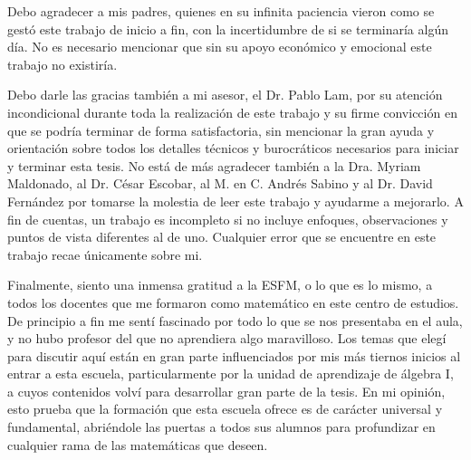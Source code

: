 {\setlength\parindent{1em}
Debo agradecer a mis padres, quienes en su infinita paciencia vieron como se gestó este trabajo de inicio a fin, con la incertidumbre de si se terminaría algún día. No es necesario mencionar que sin su apoyo económico y emocional este trabajo no existiría.

Debo darle las gracias también a mi asesor, el Dr. Pablo Lam, por su atención incondicional durante toda la realización de este trabajo y su firme convicción en que se podría terminar de forma satisfactoria, sin mencionar la gran ayuda y orientación sobre todos los detalles técnicos y burocráticos necesarios para iniciar y terminar esta tesis. No está de más agradecer también a la Dra. Myriam Maldonado, al Dr. César Escobar, al M. en C. Andrés Sabino y al Dr. David Fernández por tomarse la molestia de leer este trabajo y ayudarme a mejorarlo. A fin de cuentas, un trabajo es incompleto si no incluye enfoques, observaciones y puntos de vista diferentes al de uno. Cualquier error que se encuentre en este trabajo recae únicamente sobre mi.

Finalmente, siento una inmensa gratitud a la ESFM, o lo que es lo mismo, a todos los docentes que me formaron como matemático en este centro de estudios. De principio a fin me sentí fascinado por todo lo que se nos presentaba en el aula, y no hubo profesor del que no aprendiera algo maravilloso. Los temas que elegí para discutir aquí están en gran parte influenciados por mis más tiernos inicios al entrar a esta escuela, particularmente por la unidad de aprendizaje de álgebra I, a cuyos contenidos volví para desarrollar gran parte de la tesis. En mi opinión, esto prueba que la formación que esta escuela ofrece es de carácter universal y fundamental, abriéndole las puertas a todos sus alumnos para profundizar en cualquier rama de las matemáticas que deseen.}





\newpage
\thispagestyle{empty}
\

\newpage
{}
\thispagestyle{plain}
\tableofcontents
\newpage
\thispagestyle{empty}
\












